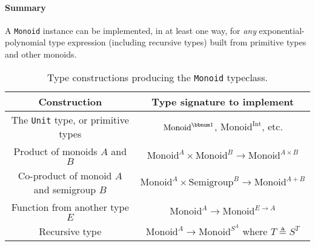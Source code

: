 \paragraph{Summary}

A \lstinline!Monoid! instance can be implemented, in at least one
way, for \emph{any} exponential-polynomial type
expression (including recursive types) built from primitive types
and other monoids.

\begin{comment}
There exist other type constructions that work for monoids in special
cases. One example is the \textsf{``}twisted product\textsf{''} $P\times Q$ where
$P$ and $Q$ are monoids and additionally $P$ has an \textbf{action
on} $Q$. The \textsf{``}action\textsf{''} is a function $\alpha:P\rightarrow Q\rightarrow Q$
obeying the special composition law, $\alpha(p_{1})\bef\alpha(p_{2})=\alpha(p_{1}\oplus p_{2})$.
The monoidal operation is defined by
\[
(p_{1}\times q_{1})\oplus(p_{2}\times q_{2})=(p_{1}\oplus p_{2})\times(\alpha(p_{2})(q_{1})\oplus q_{2})\quad.
\]
 Examples of this construction are twisted products $\left(A\rightarrow A\right)\times A$
and $\bbnum 2\times\left(\bbnum 1+A\right)$. \textemdash{} Not sure
how useful this is, and what additional properties we need.
\end{comment}

\begin{table}
\begin{centering}
\begin{tabular}{|c|c|}
\hline 
\textbf{\footnotesize{}Construction} & \textbf{\footnotesize{}Type signature to implement}\tabularnewline
\hline 
\hline 
{\footnotesize{}The }\lstinline!Unit!{\footnotesize{} type, or primitive
types} & {\footnotesize{}$\text{Monoid}^{\bbnum 1}$, $\text{Monoid}^{\text{Int}}$,
etc.}\tabularnewline
\hline 
{\footnotesize{}Product of monoids $A$ and $B$} & {\footnotesize{}$\text{Monoid}^{A}\times\text{Monoid}^{B}\rightarrow\text{Monoid}^{A\times B}$}\tabularnewline
\hline 
{\footnotesize{}Co-product of monoid $A$ and semigroup $B$} & {\footnotesize{}$\text{Monoid}^{A}\times\text{Semigroup}^{B}\rightarrow\text{Monoid}^{A+B}$}\tabularnewline
\hline 
{\footnotesize{}Function from another type $E$} & {\footnotesize{}$\text{Monoid}^{A}\rightarrow\text{Monoid}^{E\rightarrow A}$}\tabularnewline
\hline 
{\footnotesize{}Recursive type} & {\footnotesize{}$\text{Monoid}^{A}\rightarrow\text{Monoid}^{S^{A}}$
where $T\triangleq S^{T}$}\tabularnewline
\hline 
\end{tabular}
\par\end{centering}
\caption{Type constructions producing the \lstinline!Monoid! typeclass.\label{tab:Type-constructions-for-monoid}}
\end{table}


